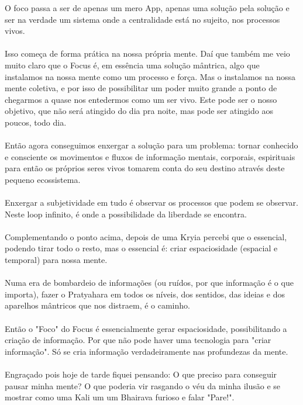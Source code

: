 \documentclass[11pt]{article}
\begin{document}
O foco passa a ser de apenas um mero App, apenas uma solução pela solução e ser na verdade um sistema onde a centralidade está no sujeito, nos processos vivos.\\\\

Isso começa de forma prática na nossa própria mente. Daí que também me veio muito claro que o Focus é, em essência uma solução mântrica, algo que instalamos na nossa mente como um processo e força. Mas o instalamos na nossa mente coletiva, e por isso de possibilitar um poder muito grande a ponto de chegarmos a quase nos entedermos como um ser vivo. Este pode ser o nosso objetivo, que não será atingido do dia pra noite, mas pode ser atingido aos poucos, todo dia.\\\\

Então agora conseguimos enxergar a solução para um problema: tornar conhecido e consciente os movimentos e fluxos de informação mentais, corporais, espirituais para então os próprios seres vivos tomarem conta do seu destino através deste pequeno ecossistema.\\\\


Enxergar a subjetividade em tudo é observar os processos que podem se observar. Neste loop infinito, é onde a possibilidade da liberdade se encontra.\\\\

Complementando o ponto acima, depois de uma Kryia percebi que o essencial, podendo tirar todo o resto, mas o essencial é: criar espaciosidade (espacial e temporal) para nossa mente.\\\\

Numa era de bombardeio de informações (ou ruídos, por que informação é o que importa), fazer o Pratyahara em todos os níveis, dos sentidos, das ideias e dos aparelhos mântricos que nos distraem, é o caminho.\\\\

Então o "Foco" do Focus é essencialmente gerar espaciosidade, possibilitando a criação de informação. Por que não pode haver uma tecnologia para "criar informação". Só se cria informação verdadeiramente nas profundezas da mente.\\\\

Engraçado pois hoje de tarde fiquei pensando: O que preciso para conseguir pausar minha mente? O que poderia vir rasgando o véu da minha ilusão e se mostrar como uma Kali um um Bhairava furioso e falar "Pare!". \\\\
\end{document}
